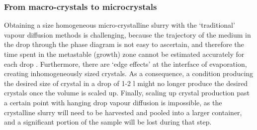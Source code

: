 \subsubsection{From macro-crystals to microcrystals} \label{sec:microcrystallisation}
Obtaining a size homogeneous micro-crystalline slurry with the ‘traditional’ vapour diffusion methods is challenging, because the trajectory of the medium in the drop through the phase diagram is not easy to ascertain, and therefore the time spent in the metastable (growth) zone cannot be estimated accurately for each drop \parencite{bealeSuccessfulSamplePreparation2019}. Furthermore, there are ‘edge effects’ at the interface of evaporation, creating inhomogeneously sized crystals. As a consequence, a condition producing the desired size of crystal in a drop of 1-2 \textmu l might no longer produce the desired crystals once the volume is scaled up. Finally, scaling up crystal production past a certain point with hanging drop vapour diffusion is impossible, as the crystalline slurry will need to be harvested and pooled into a larger container, and a significant portion of the sample will be lost during that step. 

